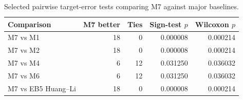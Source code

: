 \begin{table}[H]
\centering
\small
\caption{Selected pairwise target-error tests comparing M7 against major baselines.}
\label{tab:pairwise-tests}
\begin{tabular}{lrrrr}
\toprule
Comparison & M7 better & Ties & Sign-test \(p\) & Wilcoxon \(p\) \\
\midrule
M7 vs M1 & 18 & 0 & 0.000008 & 0.000214 \\
M7 vs M2 & 18 & 0 & 0.000008 & 0.000214 \\
M7 vs M4 & 6 & 12 & 0.031250 & 0.036032 \\
M7 vs M6 & 6 & 12 & 0.031250 & 0.036032 \\
M7 vs EB5 Huang--Li & 18 & 0 & 0.000008 & 0.000214 \\
\bottomrule
\end{tabular}
\end{table}
